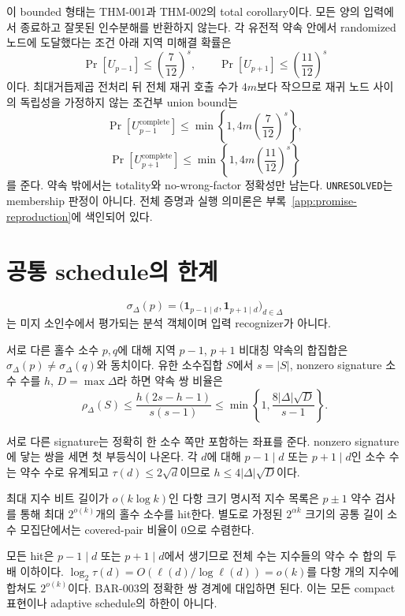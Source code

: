 \documentclass[11pt]{article}
\begin{document}
이 bounded 형태는 THM-001과 THM-002의 total corollary이다. 모든 양의
입력에서 종료하고 잘못된 인수분해를 반환하지 않는다. 각 유전적 약속
안에서 randomized 노드에 도달했다는 조건 아래 지역 미해결 확률은
\[
\Pr[U_{p-1}]\le\left(\frac7{12}\right)^s,\qquad
\Pr[U_{p+1}]\le\left(\frac{11}{12}\right)^s
\]
이다. 최대거듭제곱 전처리 뒤 전체 재귀 호출 수가 \(4m\)보다 작으므로
재귀 노드 사이의 독립성을 가정하지 않는 조건부 union bound는
\[
\Pr[U^{\mathrm{complete}}_{p-1}]
\le\min\left\{1,4m\left(\frac7{12}\right)^s\right\},
\]
\[
\Pr[U^{\mathrm{complete}}_{p+1}]
\le\min\left\{1,4m\left(\frac{11}{12}\right)^s\right\}
\]
를 준다. 약속 밖에서는 totality와 no-wrong-factor 정확성만 남는다.
\texttt{UNRESOLVED}는 membership 판정이 아니다. 전체 증명과 실행
의미론은 부록~\ref{app:promise-reproduction}에 색인되어 있다.

\section{공통 schedule의 한계}

\[
\sigma_\Delta(p)=
\bigl(\mathbf1_{p-1\mid d},\mathbf1_{p+1\mid d}\bigr)_{d\in\Delta}
\]
는 미지 소인수에서 평가되는 분석 객체이며 입력 recognizer가 아니다.

{}
서로 다른 홀수 소수 \(p,q\)에 대해 지역
\(p-1\), \(p+1\) 비대칭 약속의 합집합은
\(\sigma_\Delta(p)\ne\sigma_\Delta(q)\)와 동치이다. 유한 소수집합
\(S\)에서 \(s=|S|\), nonzero signature 소수 수를 \(h\),
\(D=\max\Delta\)라 하면 약속 쌍 비율은
\[
\rho_\Delta(S)\le
\frac{h(2s-h-1)}{s(s-1)}
\le\min\left\{1,\frac{8|\Delta|\sqrt D}{s-1}\right\}.
\]

\begin{claimproof}
서로 다른 signature는 정확히 한 소수 쪽만 포함하는 좌표를 준다.
nonzero signature에 닿는 쌍을 세면 첫 부등식이 나온다. 각 \(d\)에
대해 \(p-1\mid d\) 또는 \(p+1\mid d\)인 소수 수는 약수 수로 유계되고
\(\tau(d)\le2\sqrt d\)이므로 \(h\le4|\Delta|\sqrt D\)이다.
\end{claimproof}

{}
최대 지수 비트 길이가
\(o(k\log k)\)인 다항 크기 명시적 지수 목록은 \(p\pm1\) 약수 검사를
통해 최대 \(2^{o(k)}\)개의 홀수 소수를 hit한다. 별도로 가정된
\(2^{\alpha k}\) 크기의 공통 길이 소수 모집단에서는 covered-pair
비율이 0으로 수렴한다.

\begin{claimproof}
모든 hit은 \(p-1\mid d\) 또는 \(p+1\mid d\)에서 생기므로 전체 수는
지수들의 약수 수 합의 두 배 이하이다.
\(\log_2\tau(d)=O(\ell(d)/\log\ell(d))=o(k)\)를 다항 개의 지수에
합쳐도 \(2^{o(k)}\)이다. BAR-003의 정확한 쌍 경계에 대입하면 된다.
이는 모든 compact 표현이나 adaptive schedule의 하한이 아니다.
\end{claimproof}
\end{document}
